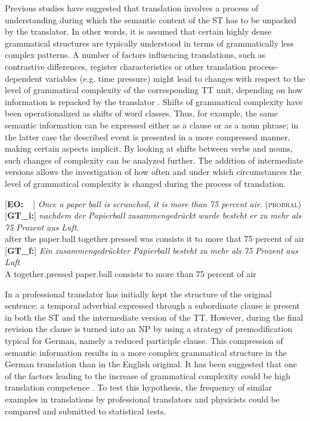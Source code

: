 \documentclass[output=paper]{LSP/langsci}
\begin{document}
Previous studies have suggested that translation involves a process of understanding during which the semantic content of the ST has to be unpacked by the translator. In other words, it is assumed that certain highly dense grammatical structures are typically understood in terms of grammatically less complex patterns. A number of factors influencing translations, such as contrastive differences, register characteristics or other translation process-dependent variables (e.g. time pressure) might lead to changes with respect to the level of grammatical complexity of the corresponding TT unit, depending on how information is repacked by the translator \citep{Steiner2001,Hansen-Schirra2012}. Shifts of grammatical complexity have been operationalized as shifts of word classes. Thus, for example, the same semantic information can be expressed either as a clause or as a noun phrase; in the latter case the described event is presented in a more compressed manner, making certain aspects implicit. By looking at shifts between verbs and nouns, such changes of complexity can be analyzed further. The addition of intermediate versions allows the investigation of how often and under which circumstances the level of grammatical complexity is changed during the process of translation. 

\ea \label{ex:1:9}
\begin{xlist}
\exi{}[\textbf{EO:~~}]{ \emph{Once} \emph{a} \emph{paper} \emph{ball} \emph{is} \emph{scrunched}, \emph{it} \emph{is} \emph{more} \emph{than} \emph{75 percent} \emph{air}. (\textsc{probral})}
\exi{}[\textbf{GT\_i:}]{
\gll \emph{nachdem} \emph{der} \emph{Papierball} \emph{zusammengedrückt} \emph{wurde} \emph{besteht} \emph{er} \emph{zu} \emph{mehr} \emph{als} \emph{75} \emph{Prozent} \emph{aus} \emph{Luft}.\\
after the paper.ball together.pressed was consists it to more that 75 percent of air\\}
\exi{}[\textbf{GT\_f:}]{
\gll \emph{Ein} \emph{zusammengedrückter} \emph{Papierball} \emph{besteht} \emph{zu} \emph{mehr} \emph{als} \emph{75} \emph{Prozent} \emph{aus} \emph{Luft}\\
A together.pressed paper.ball consists to more than 75 percent of air\\
}
\end{xlist}
\z

In  a professional translator has initially kept the structure of the original sentence: a temporal adverbial expressed through a subordinate clause is present in both the ST and the intermediate version of the TT. However, during the final revision the clause is turned into an NP by using a strategy of premodification typical for German, namely a reduced participle clause. This compression of semantic information results in a more complex grammatical structure in the German translation than in the English original. It has been suggested that one of the factors leading to the increase of grammatical complexity could be high translation competence \citep[260]{Hansen-Schirra2012}. To test this hypothesis, the frequency of similar examples in translations by professional translators and physicists could be compared and submitted to statistical tests. 
\end{document}
